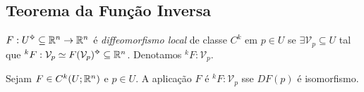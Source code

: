 \subsection{Teorema da Função Inversa}
\begin{definition}
    \(F : U\ab\subseteq \R^n\to \R^n\) é \emph{diffeomorfismo local} de classe \(C^k\) em \(p\in U\) se \(\exists \mathcal{V}_p\subseteq U\) tal que \(^k F: \mathcal{V}_p\simeq F(\mathcal{V}_p)\ab \subseteq \R^n\). Denotamos \(^k F: \mathcal{V}_p\). 
\end{definition}


\begin{theorem}
    Sejam \(F \in C^k(U; \mathbb{R}^n)\) e \(p\in U\). A aplicação \(F\) é \(^k F : \mathcal{V}_p\) sse \(DF(p)\) é isomorfismo.  
\end{theorem}

